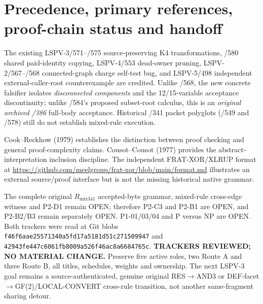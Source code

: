 \documentclass[11pt]{article}
\begin{document}
\section{Precedence, primary references, proof-chain status and handoff}
The existing LSPV-3/571--/575 source-preserving K4 transformations, /580 shared paid-identity copying, LSPV-4/553 dead-owner pruning, LSPV-2/567--/568 connected-graph charge self-test bug, and LSPV-5/498 independent external-caller-root counterexample are credited. Unlike /568, the new concrete falsifier isolates \emph{disconnected components} and the 12/15-variable acceptance discontinuity; unlike /584's proposed subset-root calculus, this is an \emph{original archived /386} full-body acceptance. Historical /341 packet polyglots (/549 and /578) still do not establish mixed-rule execution.
\par
Cook--Reckhow (1979) establishes the distinction between proof checking and general proof-complexity claims. Cousot--Cousot (1977) provides the abstract-interpretation inclusion discipline. The independent FRAT-XOR/XLRUP format at \url{https://github.com/meelgroup/frat-xor/blob/main/format.md} illustrates an external source/proof interface but is not the missing historical native grammar.
\par
The complete original $R_{\mathrm{mix341}}$ accepted-byte grammar, mixed-rule cross-edge witness and P2-D1 remain OPEN; therefore P2-C3 and P2-B1 are OPEN, and P2-B2/B3 remain separately OPEN. P1-01/03/04 and P versus NP are OPEN. Both trackers were read at Git blobs \texttt{f46f6aae25571340a5fd17a5181d51c271509947} and \texttt{42943fe447c6061fb8009a526f46ac8a6684765c}. \textbf{TRACKERS REVIEWED; NO MATERIAL CHANGE.} Preserve five active roles, two Route A and three Route B, all titles, schedules, weights and ownership. The next LSPV-3 goal remains a source-authenticated, genuine original RES$\to$AND3 or DEF-facet$\to$GF(2)/LOCAL-CONVERT cross-rule transition, not another same-fragment sharing detour.
\end{document}
